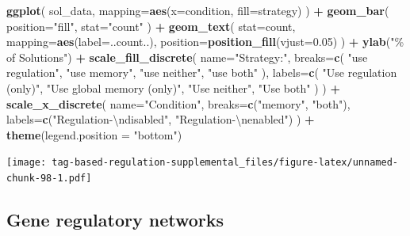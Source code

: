 \documentclass[
]{book}
\newenvironment{Shaded}{\begin{snugshade}}{\end{snugshade}}
\newcommand{\CharTok}[1]{\textcolor[rgb]{0.31,0.60,0.02}{#1}}
\newcommand{\DataTypeTok}[1]{\textcolor[rgb]{0.13,0.29,0.53}{#1}}
\newcommand{\FloatTok}[1]{\textcolor[rgb]{0.00,0.00,0.81}{#1}}
\newcommand{\KeywordTok}[1]{\textcolor[rgb]{0.13,0.29,0.53}{\textbf{#1}}}
\newcommand{\NormalTok}[1]{#1}
\newcommand{\OperatorTok}[1]{\textcolor[rgb]{0.81,0.36,0.00}{\textbf{#1}}}
\newcommand{\StringTok}[1]{\textcolor[rgb]{0.31,0.60,0.02}{#1}}
\begin{document}
\begin{Shaded}
\begin{Highlighting}[]
\KeywordTok{ggplot}\NormalTok{( sol\_data, }\DataTypeTok{mapping=}\KeywordTok{aes}\NormalTok{(}\DataTypeTok{x=}\NormalTok{condition, }\DataTypeTok{fill=}\NormalTok{strategy) ) }\OperatorTok{+}
\StringTok{  }\KeywordTok{geom\_bar}\NormalTok{(}
    \DataTypeTok{position=}\StringTok{"fill"}\NormalTok{,}
    \DataTypeTok{stat=}\StringTok{"count"}
\NormalTok{  ) }\OperatorTok{+}
\StringTok{  }\KeywordTok{geom\_text}\NormalTok{(}
    \DataTypeTok{stat=}\StringTok{\textquotesingle{}count\textquotesingle{}}\NormalTok{,}
    \DataTypeTok{mapping=}\KeywordTok{aes}\NormalTok{(}\DataTypeTok{label=}\NormalTok{..count..),}
    \DataTypeTok{position=}\KeywordTok{position\_fill}\NormalTok{(}\DataTypeTok{vjust=}\FloatTok{0.05}\NormalTok{)}
\NormalTok{  ) }\OperatorTok{+}
\StringTok{  }\KeywordTok{ylab}\NormalTok{(}\StringTok{"\% of Solutions"}\NormalTok{) }\OperatorTok{+}
\StringTok{  }\KeywordTok{scale\_fill\_discrete}\NormalTok{(}
    \DataTypeTok{name=}\StringTok{"Strategy:"}\NormalTok{,}
    \DataTypeTok{breaks=}\KeywordTok{c}\NormalTok{(}
      \StringTok{"use regulation"}\NormalTok{,}
      \StringTok{"use memory"}\NormalTok{,}
      \StringTok{"use neither"}\NormalTok{,}
      \StringTok{"use both"}
\NormalTok{    ),}
    \DataTypeTok{labels=}\KeywordTok{c}\NormalTok{(}
      \StringTok{"Use regulation (only)"}\NormalTok{,}
      \StringTok{"Use global memory (only)"}\NormalTok{,}
      \StringTok{"Use neither"}\NormalTok{,}
      \StringTok{"Use both"}
\NormalTok{    )}
\NormalTok{  ) }\OperatorTok{+}
\StringTok{  }\KeywordTok{scale\_x\_discrete}\NormalTok{(}
    \DataTypeTok{name=}\StringTok{"Condition"}\NormalTok{,}
    \DataTypeTok{breaks=}\KeywordTok{c}\NormalTok{(}\StringTok{"memory"}\NormalTok{, }\StringTok{"both"}\NormalTok{),}
    \DataTypeTok{labels=}\KeywordTok{c}\NormalTok{(}\StringTok{"Regulation{-}}\CharTok{\textbackslash{}n}\StringTok{disabled"}\NormalTok{, }\StringTok{"Regulation{-}}\CharTok{\textbackslash{}n}\StringTok{enabled"}\NormalTok{)}
\NormalTok{  ) }\OperatorTok{+}
\StringTok{  }\KeywordTok{theme}\NormalTok{(}\DataTypeTok{legend.position =} \StringTok{"bottom"}\NormalTok{)}
\end{Highlighting}
\end{Shaded}

\texttt{[image: tag-based-regulation-supplemental\_files/figure-latex/unnamed-chunk-98-1.pdf]}

\hypertarget{gene-regulatory-networks-2}{%
\subsection{Gene regulatory networks}\label{gene-regulatory-networks-2}}
\end{document}
